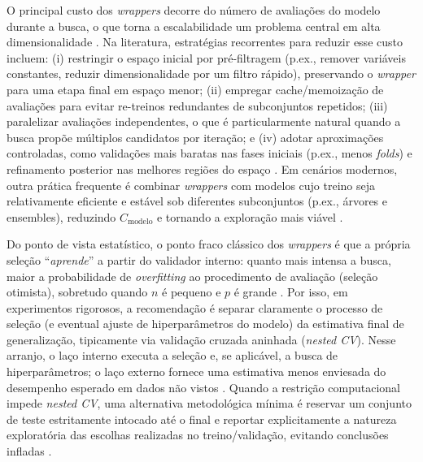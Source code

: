 O principal custo dos \textit{wrappers} decorre do número de avaliações do modelo durante a busca, o que torna a escalabilidade um problema central em alta dimensionalidade \cite{bolon2018scalability,Emmoh2024}. Na literatura, estratégias recorrentes para reduzir esse custo incluem: (i) restringir o espaço inicial por pré-filtragem (p.ex., remover variáveis constantes, reduzir dimensionalidade por um filtro rápido), preservando o \textit{wrapper} para uma etapa final em espaço menor; (ii) empregar cache/memoização de avaliações para evitar re-treinos redundantes de subconjuntos repetidos; (iii) paralelizar avaliações independentes, o que é particularmente natural quando a busca propõe múltiplos candidatos por iteração; e (iv) adotar aproximações controladas, como validações mais baratas nas fases iniciais (p.ex., menos \textit{folds}) e refinamento posterior nas melhores regiões do espaço \cite{Theng2024,Bouchlaghem2022,de2006parallelizing}. Em cenários modernos, outra prática frequente é combinar \textit{wrappers} com modelos cujo treino seja relativamente eficiente e estável sob diferentes subconjuntos (p.ex., árvores e ensembles), reduzindo \(C_{\text{modelo}}\) e tornando a exploração mais viável \cite{Theng2024,bashir2022novel}.

Do ponto de vista estatístico, o ponto fraco clássico dos \textit{wrappers} é que a própria seleção “\emph{aprende}” a partir do validador interno: quanto mais intensa a busca, maior a probabilidade de \emph{overfitting} ao procedimento de avaliação (seleção otimista), sobretudo quando \(n\) é pequeno e \(p\) é grande \cite{KOHAVI1997273,reunanen2012overfitting,Dhal2022}. Por isso, em experimentos rigorosos, a recomendação é separar claramente o processo de seleção (e eventual ajuste de hiperparâmetros do modelo) da estimativa final de generalização, tipicamente via validação cruzada aninhada (\textit{nested CV}). Nesse arranjo, o laço interno executa a seleção e, se aplicável, a busca de hiperparâmetros; o laço externo fornece uma estimativa menos enviesada do desempenho esperado em dados não vistos \cite{Dhal2022,10.1007/978-3-031-23092-9_12}. Quando a restrição computacional impede \textit{nested CV}, uma alternativa metodológica mínima é reservar um conjunto de teste estritamente intocado até o final e reportar explicitamente a natureza exploratória das escolhas realizadas no treino/validação, evitando conclusões infladas \cite{reunanen2012overfitting,Theng2024}.

